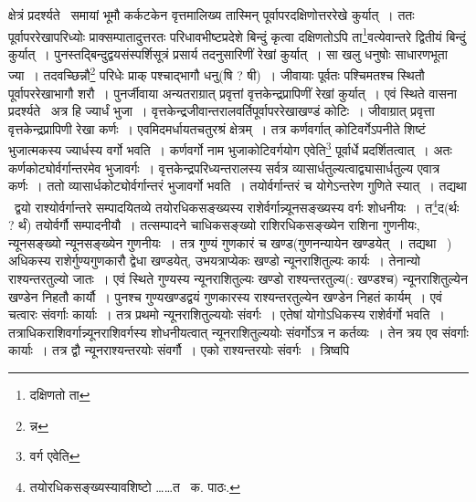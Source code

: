 \documentclass[11pt, openany]{book}
\begin{document}
\noindent क्षेत्रं प्रदर्श्यते \textendash\ समायां भूमौ कर्कटकेन वृत्तमालिख्य तास्मिन् पूर्वापरदक्षिणोत्तररेखे कुर्यात्~। ततः पूर्वापररेखापरिध्योः प्राक्सम्पातादुत्तरतः परिधावभीष्टप्रदेशे बिन्दुं कृत्वा दक्षिणतोऽपि ता\renewcommand{\thefootnote}{१}\footnote{दक्षिणतो ता}वत्येवान्तरे द्वितीयं बिन्दुं कुर्यात्~। पुनस्तद्बिन्दुद्वयसंस्पर्शिसूत्रं प्रसार्य तदनुसारिणीं रेखां कुर्यात्~। सा खलु धनुषोः साधारणभूता ज्या~। तदवच्छिन्नौ\renewcommand{\thefootnote}{२}\footnote{न्न} परिधेः प्राक् पश्चाद्भागौ धनु(षि ? षी)~। जीवायाः पूर्वतः पश्चिमतश्च स्थितौ पूर्वापररेखाभागौ शरौ~। पुनर्जीवाया अन्यतराग्रात् प्रवृत्तां वृत्तकेन्द्रप्रापिणीं रेखां कुर्यात्~। एवं स्थिते वासना प्रदर्श्यते \textendash\ अत्र हि ज्यार्धं भुजा~। वृत्तकेन्द्रजीवान्तरालवर्तिपूर्वापररेखाखण्डं कोटिः~। जीवाग्रात् प्रवृत्ता वृत्तकेन्द्रप्रापिणी रेखा कर्णः~। एवमिदमर्धायतचतुरश्रं क्षेत्रम्~। तत्र कर्णवर्गात् कोटिवर्गेऽपनीते शिष्टं भुजात्मकस्य ज्यार्धस्य वर्गो भवति~। कर्णवर्गो नाम भुजाकोटिवर्गयोग एवेति\renewcommand{\thefootnote}{३}\footnote{वर्ग एवेति} पूर्वार्धे प्रदर्शितत्वात्~। अतः कर्णकोट्योर्वर्गान्तरमेव भुजावर्गः~। वृत्तकेन्द्रपरिध्यन्तरालस्य सर्वत्र व्यासार्धतुल्यत्वाद्व्यासार्धतुल्य एवात्र कर्णः~। ततो व्यासार्धकोट्योर्वर्गान्तरं भुजावर्गो भवति~। तयोर्वर्गान्तरं च योगेऽन्तरेण गुणिते स्यात्~। तद्यथा \textendash\ द्वयो राश्योर्वर्गान्तरे सम्पादयितव्ये तयोरधिकसङ्ख्यस्य राशेर्वर्गान्न्यूनसङ्ख्यस्य वर्गः शोधनीयः~। त\renewcommand{\thefootnote}{४}\footnote{तयोरधिकसङ्ख्यस्यावशिष्टो \ldots \ldots त \textendash\ क. पाठः.}द(र्थः ? र्थं) तयोर्वर्गौ सम्पादनीयौ~। तत्सम्पादने चाधिकसङ्ख्यो राशिरधिकसङ्ख्येन राशिना गुणनीयः, न्यूनसङ्ख्यो न्यूनसङ्ख्येन गुणनीयः~। तत्र गुण्यं गुणकारं च खण्ड(गुणनन्यायेन खण्डयेत्~। तद्यथा \textendash\ ) अधिकस्य राशेर्गुण्यगुणकारौ द्वेधा खण्डयेत्, उभयत्राप्येकः खण्डो न्यूनराशितुल्यः कार्यः~। तेनान्यो राश्यन्तरतुल्यो जातः~। एवं स्थिते गुण्यस्य न्यूनराशितुल्यः खण्डो राश्यन्तरतुल्य(: खण्डश्च) न्यूनराशितुल्येन खण्डेन निहतौ कार्यौ~। पुनश्च गुण्यखण्डद्वयं गुणकारस्य राश्यन्तरतुल्येन खण्डेन निहतं कार्यम्~। एवं चत्वारः संवर्गाः कार्याः~। तत्र प्रथमो न्यूनराशितुल्ययोः संवर्गः~। एतेषां
योगोऽधिकस्य राशेर्वर्गो भवति~। तत्राधिकराशिवर्गान्न्यूनराशिवर्गस्य शोधनीयत्वात् न्यूनराशितुल्ययोः संवर्गोऽत्र न कर्तव्यः~। तेन त्रय एव संवर्गाः कार्याः~। तत्र द्वौ न्यूनराश्यन्तरयोः संवर्गौ~। एको राश्यन्तरयोः संवर्गः~। त्रिष्वपि

\newpage
\end{document}
